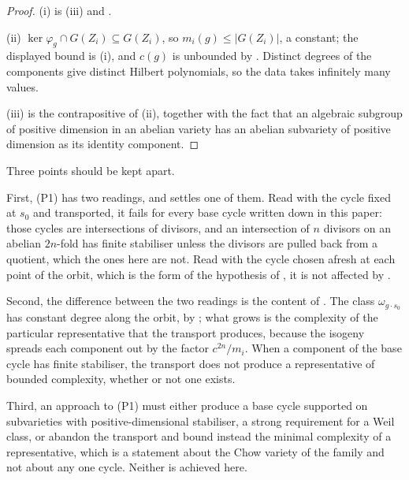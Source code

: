 \begin{proof}
(i) is (iii) and .

(ii) $\ker\varphi_{g}\cap G(Z_{i})\subseteq G(Z_{i})$, so
$m_{i}(g)\le|G(Z_{i})|$, a constant; the displayed bound is (i), and $c(g)$ is
unbounded by . Distinct degrees of the components give
distinct Hilbert polynomials, so the data takes infinitely many values.

(iii) is the contrapositive of (ii), together with the fact that an algebraic
subgroup of positive dimension in an abelian variety has an abelian subvariety
of positive dimension as its identity component.
\end{proof}

\begin{remark}\label{rem:p1meaning}
Three points should be kept apart.

First, \textup{(P1)} has two readings, and  settles one of
them. Read with the cycle fixed at $s_{0}$ and transported, it fails for every
base cycle written down in this paper: those cycles are intersections of
divisors, and an intersection of $n$ divisors on an abelian $2n$-fold has
finite stabiliser unless the divisors are pulled back from a quotient, which
the ones here are not. Read with the cycle chosen afresh at each point of the
orbit, which is the form of the hypothesis of , it is
not affected by .

Second, the difference between the two readings is the content of
. The class $\omega_{g\cdot s_{0}}$ has constant degree
along the orbit, by ; what grows is the complexity
of the particular representative that the transport produces, because the
isogeny spreads each component out by the factor $c^{2n}/m_{i}$. When a
component of the base cycle has finite stabiliser, the transport does not
produce a representative of bounded complexity, whether or not one exists.

Third, an approach to \textup{(P1)} must either produce a base cycle supported
on subvarieties with positive-dimensional stabiliser, a strong requirement for
a Weil class, or abandon the transport and bound instead the minimal
complexity of a representative, which is a statement about the Chow variety of
the family and not about any one cycle. Neither is achieved here.
\end{remark}

